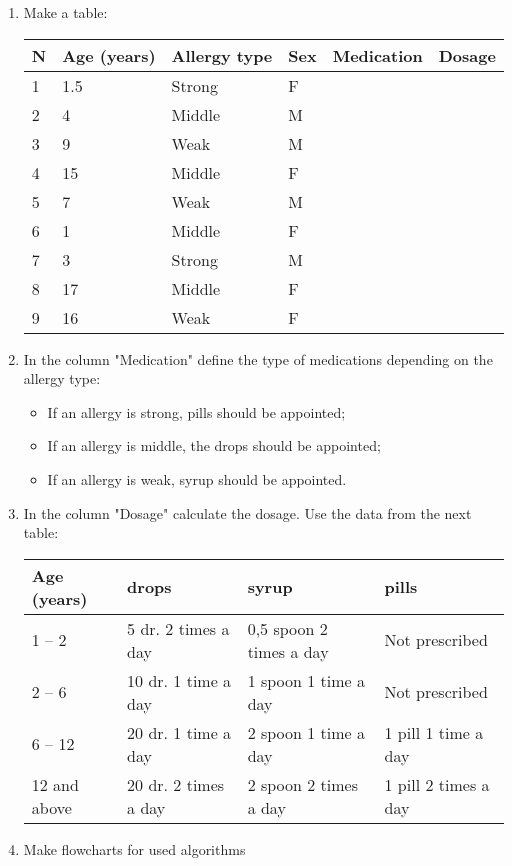 \begin{enumerate}
 \item Make a table:
 \begin{center}
\begin{tabular}{llllll}
N & Age (years) & Allergy type & Sex & Medication & Dosage\\ \hline
1 & 1.5 & Strong & F &  & \\
2 & 4 & Middle & M &  & \\
3 & 9 & Weak & M &  & \\
4 & 15 & Middle & F &  & \\
5 & 7 & Weak & M &  & \\
6 & 1 & Middle & F &  & \\
7 & 3 & Strong & M &  & \\
8 & 17 & Middle & F &  & \\
9 & 16 & Weak & F &  & 
 \end{tabular}
 \end{center}

 \item In the column "Medication"  define the type of medications depending on the allergy type: 
 \begin{itemize}
  \item If an allergy is strong, pills should be appointed; 
  \item If an allergy is middle, the drops should be appointed;
  \item If an allergy is weak, syrup should be appointed. 
 \end{itemize}

 \item In the column "Dosage" calculate the dosage. 
Use the data from the next table:
\begin{center}
\begin{tabular}{llll}
Age (years) & drops & syrup & pills\\ \hline
1 -- 2 & 5 dr. 2 times a day & 0,5 spoon 2 times a day & Not prescribed\\
2 -- 6 & 10 dr. 1 time a day & 1 spoon 1 time a day  & Not prescribed\\
6 -- 12 & 20 dr. 1 time a day & 2 spoon 1 time a day  & 1 pill 1 time a day\\
12 and above & 20 dr. 2 times a day & 2 spoon 2 times a day  & 1 pill 2 times a day 
\end{tabular}
\end{center}

 \item Make flowcharts for used algorithms 
\end{enumerate}